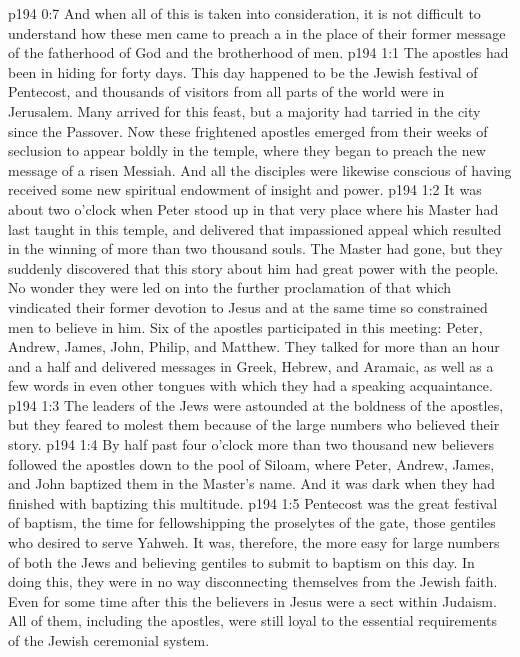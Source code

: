 \vs p194 0:7 And when all of this is taken into consideration, it is not difficult to understand how these men came to preach a  in the place of their former message of the fatherhood of God and the brotherhood of men.
\vs p194 1:1 The apostles had been in hiding for forty days. This day happened to be the Jewish festival of Pentecost, and thousands of visitors from all parts of the world were in Jerusalem. Many arrived for this feast, but a majority had tarried in the city since the Passover. Now these frightened apostles emerged from their weeks of seclusion to appear boldly in the temple, where they began to preach the new message of a risen Messiah. And all the disciples were likewise conscious of having received some new spiritual endowment of insight and power.
\vs p194 1:2 It was about two o’clock when Peter stood up in that very place where his Master had last taught in this temple, and delivered that impassioned appeal which resulted in the winning of more than two thousand souls. The Master had gone, but they suddenly discovered that this story about him had great power with the people. No wonder they were led on into the further proclamation of that which vindicated their former devotion to Jesus and at the same time so constrained men to believe in him. Six of the apostles participated in this meeting: Peter, Andrew, James, John, Philip, and Matthew. They talked for more than an hour and a half and delivered messages in Greek, Hebrew, and Aramaic, as well as a few words in even other tongues with which they had a speaking acquaintance.
\vs p194 1:3 The leaders of the Jews were astounded at the boldness of the apostles, but they feared to molest them because of the large numbers who believed their story.
\vs p194 1:4 By half past four o’clock more than two thousand new believers followed the apostles down to the pool of Siloam, where Peter, Andrew, James, and John baptized them in the Master’s name. And it was dark when they had finished with baptizing this multitude.\plusone
\vs p194 1:5 Pentecost was the great festival of baptism, the time for fellowshipping the proselytes of the gate, those gentiles who desired to serve Yahweh. It was, therefore, the more easy for large numbers of both the Jews and believing gentiles to submit to baptism on this day. In doing this, they were in no way disconnecting themselves from the Jewish faith. Even for some time after this the believers in Jesus were a sect within Judaism. All of them, including the apostles, were still loyal to the essential requirements of the Jewish ceremonial system.
